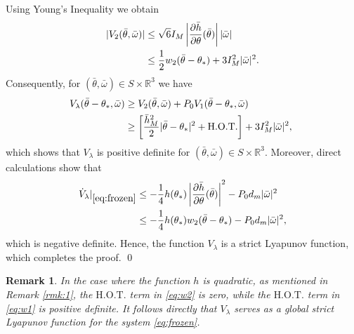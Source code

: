 \documentclass{ifacconf}
\newtheorem{remark}{Remark}
\begin{document}
\begin{pf}
    Using Young's Inequality we obtain
    \begin{align}
        |V_2(\bar{\theta},\bar{\omega})|&\le  \sqrt{6} I_M\left| \frac{\partial \bar{h}}{\partial \theta}(\bar{\theta}) \right| |\bar{\omega}| \notag\\
        &\le  \frac{1}{2}w_2(\bar{\theta}-\theta_*) + 3I_M^2 |\bar{\omega}|^2. \label{eq:V2}
    \end{align}
     Consequently, for $(\bar{\theta},\bar{\omega})\in S\times \mathbb{R}^3$ we have
	\begin{align}
		\hspace{-0.1cm}V_\lambda(\bar{\theta}-\theta_*,\bar{\omega})&\ge V_2(\bar{\theta},\bar{\omega}) + P_0 V_1(\bar{\theta}-\theta_*,\bar{\omega}) \notag\\
        &\ge \left[\frac{\bar{h}_M^2}{2}|\bar{\theta}- \theta_*|^2+\text{H.O.T.}\right]  + 3I_M^2 |\bar{\omega}|^2,
	\end{align}
    which shows that $V_\lambda$ is positive definite for $(\bar{\theta},\bar{\omega})\in S\times \mathbb{R}^3$.
    Moreover, direct calculations show that
    \begin{align}
        {\dot{V}_\lambda}|_{\eqref{eq:frozen}}&\le -\frac{1}{4}    h(\theta_*) \left|\frac{\partial \bar{h}}{\partial \theta}(\bar{\theta}) \right|^2 - P_0 d_m |\bar{\omega}|^2 \notag \\
        &\le -\frac{1}{4}    h(\theta_*)w_2(\bar{\theta} - \theta_*)- P_0 d_m |\bar{\omega}|^2, \label{eq:40}
    \end{align}
    which is negative definite. Hence, the function $V_\lambda$ is a strict Lyapunov function, which completes the proof. \qed
\end{pf}

\begin{remark}
    In the case where the function $h$ is quadratic, as mentioned in Remark \ref{rmk:1}, the $\text{H.O.T.}$ term in \eqref{eq:w2} is zero, while the $\text{H.O.T.}$ term in \eqref{eq:w1} is positive definite. It follows directly that $V_\lambda$ serves as a \textit{global} strict Lyapunov function for the system \eqref{eq:frozen}.
\end{remark}
\end{document}
